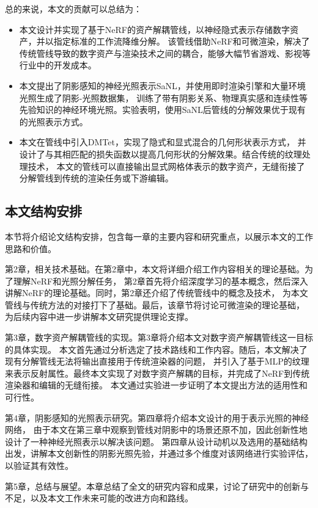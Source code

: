 总的来说，本文的贡献可以总结为：

\begin{itemize}
  \item 本文设计并实现了基于NeRF的资产解耦管线，以神经隐式表示存储数字资产，并以指定标准的工作流降维分解。
  该管线借助NeRF和可微渲染，解决了传统管线导致的数字资产与渲染技术之间的耦合，能够大幅节省游戏、影视等行业中的开发成本。
  \item 本文提出了阴影感知的神经光照表示SaNL，并使用即时渲染引擎和大量环境光照生成了阴影-光照数据集，
  训练了带有阴影关系、物理真实感和连续性等先验知识的神经环境光照。实验表明，使用SaNL后管线的分解效果优于现有的光照表示方式。
  \item 本文在管线中引入DMTet，实现了隐式和显式混合的几何形状表示方式，
  并设计了与其相匹配的损失函数以提高几何形状的分解效果。结合传统的纹理处理技术，
  本文的管线可以直接输出显式网格体表示的数字资产，无缝衔接了分解管线到传统的渲染任务或下游编辑。
\end{itemize}

\subsection{本文结构安排}
本节将介绍论文结构安排，包含每一章的主要内容和研究重点，以展示本文的工作思路和价值。

第2章，相关技术基础。在第2章中，本文将详细介绍工作内容相关的理论基础。为了理解NeRF和光照分解任务，
第2章首先将介绍深度学习的基本概念，然后深入讲解NeRF的理论基础。同时，第2章还介绍了传统管线中的概念及技术，
为本文管线与传统方法的对接打下了基础。最后，该章节将讨论可微渲染的理论基础，
为后续内容中进一步讲解本文研究提供理论支撑。

第3章，数字资产解耦管线的实现。第3章将介绍本文对数字资产解耦管线这一目标的具体实现。
本文首先通过分析选定了技术路线和工作内容。随后，本文解决了现有分解管线无法将输出直接用于传统渲染器的问题，
并引入了基于MLP的纹理来表示反射属性。最终本文实现了对数字资产解耦的目标，并完成了NeRF到传统渲染器和编辑的无缝衔接。
本文通过实验进一步证明了本文提出方法的适用性和可行性。

第4章，阴影感知的光照表示研究。第四章将介绍本文设计的用于表示光照的神经网络，
由于本文在第三章中观察到管线对阴影中的场景还原不加，因此创新性地设计了一种神经光照表示以解决该问题。
第四章从设计动机以及选用的基础结构出发，讲解本文创新性的阴影光照先验，并通过多个维度对该网络进行实验评估，以验证其有效性。

第5章，总结与展望。本章总结了全文的研究内容和成果，讨论了研究中的创新与不足，以及本文工作未来可能的改进方向和路线。

